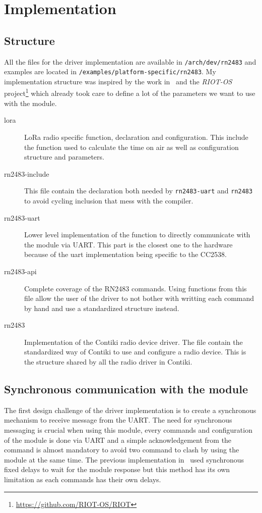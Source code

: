 \section{Implementation}

\subsection{Structure}

All the files for the driver implementation are available in
\lstinline{/arch/dev/rn2483} and examples are located in
\lstinline{/examples/platform-specific/rn2483}.
My implementation structure was inspired by the work in~\cite{8847137} and the
\emph{RIOT-OS} project\footnote{\url{https://github.com/RIOT-OS/RIOT}} which
already took care to define a lot of the parameters we want to use with the
module.

\begin{description}
  \item[lora] LoRa radio specific function, declaration and configuration. This
    include the function used to calculate the time on air as well as
    configuration structure and parameters.
  \item[rn2483-include] This file contain the declaration both needed by
    \lstinline{rn2483-uart} and \lstinline{rn2483} to avoid cycling inclusion
    that mess with the compiler.
  \item[rn2483-uart] Lower level implementation of the function to directly
    communicate with the module via UART\@. This part is the closest one to the
    hardware because of the uart implementation being specific to the CC2538.
  \item[rn2483-api] Complete coverage of the RN2483 commands. Using functions
    from this file allow the user of the driver to not bother with writting
    each command by hand and use a standardized structure instead.
  \item[rn2483] Implementation of the Contiki radio device driver. The file
    contain the standardized way of Contiki to use and configure a radio device.
    This is the structure shared by all the radio driver in Contiki.
\end{description}

\subsection{Synchronous communication with the module}

The first design challenge of the driver implementation is to create a
synchronous mechanism to receive message from the UART\@. 
The need for synchronous messaging is crucial when using this module, every
commands and configuration of the module is done via UART and a simple
acknowledgement from the command is almost mandatory to avoid two command
to clash by using the module at the same time.
The previous implementation in~\cite{8847137} used synchronous fixed delays to 
wait for the module response but this method has its own limitation 
as each commands has their own delays.


